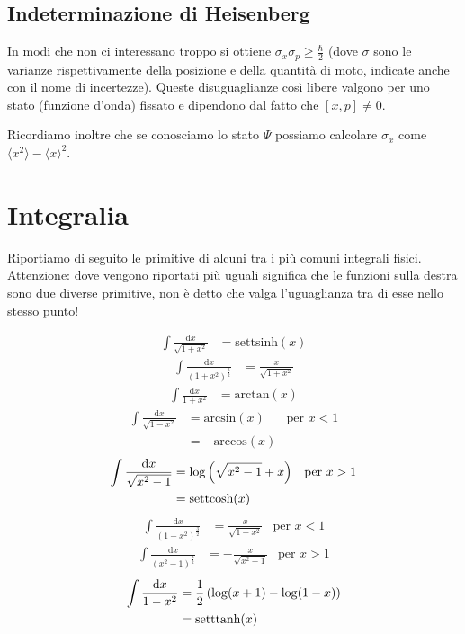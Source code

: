 \documentclass[10pt,a4paper]{article}
\newcommand{\de}{{\ensuremath{ \mbox{d}}}}
\begin{document}
\begin{multicols}{2}
  \subsection*{Indeterminazione di Heisenberg}
  In modi che non ci interessano troppo si ottiene $\sigma_x \sigma_p \ge \frac{\hbar}{2}$ (dove $\sigma$ sono le varianze rispettivamente della posizione e della quantità di moto, indicate anche con il nome di incertezze). Queste disuguaglianze così libere valgono per uno stato (funzione d'onda) fissato e dipendono dal fatto che $[x, p] \neq 0$.

  Ricordiamo inoltre che se conosciamo lo stato $\Psi$ possiamo calcolare $\sigma_x$ come $\langle x^2 \rangle - {\langle x \rangle}^2$.  

  \clearpage
  \section*{Integralia}
  Riportiamo di seguito le primitive di alcuni tra i più comuni integrali fisici. Attenzione: dove vengono riportati più uguali significa che le funzioni sulla destra sono due diverse primitive, non è detto che valga l'uguaglianza tra di esse nello stesso punto!

  \begin{align*}
    \int \frac{\de x}{\sqrt{1 + x^2}} & = \text{settsinh}(x)
  \end{align*}
  \begin{align*}
    \int \frac{\de x}{(1 + x^2)^{\frac{3}{2}}} & = \frac{x}{\sqrt{1 + x^2}}
  \end{align*}
  \begin{align*}
    \int \frac{\de x}{1 + x^2} & = \text{arctan}(x)
  \end{align*}
  \begin{align*}
    \int \frac{\de x}{\sqrt{1 - x^2}} & = \text{arcsin}(x)   & \text{per } x < 1 \\
                                      & = - \text{arccos}(x) & 
  \end{align*}
  \begin{align*}
    \int \frac{\de x}{\sqrt{x^2 - 1}} & = \log \lrt{\sqrt{x^2 - 1} + x} & \text{per } x > 1 \\
                                      & = \text{settcosh}(x)            & 
  \end{align*}
  \begin{align*}
    \int \frac{\de x}{(1 - x^2)^{\frac{3}{2}}} & = \frac{x}{\sqrt{1 - x^2}} & \text{per } x < 1
  \end{align*}
  \begin{align*}
    \int \frac{\de x}{(x^2 - 1)^{\frac{3}{2}}} & = - \frac{x}{\sqrt{x^2 - 1}} & \text{per } x > 1
  \end{align*}
  \begin{align*}
    \int \frac{\de x}{1 - x^2} & = \frac{1}{2} \lrt{\log (x + 1) - \log (1 - x)} \\
                               & = \text{setttanh}(x)
  \end{align*}


\end{multicols}
\end{document}
